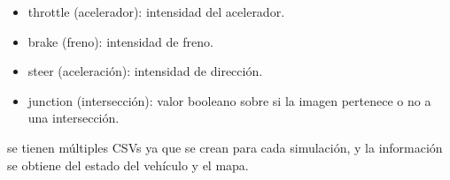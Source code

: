 \begin{itemize}[nosep]
	\item throttle (acelerador): intensidad del acelerador.
	\item brake (freno): intensidad de freno.
	\item steer (aceleración): intensidad de dirección.
	\item junction (intersección): valor booleano sobre si la imagen pertenece o no a una intersección.
\end{itemize}

se tienen múltiples CSVs ya que se crean para cada simulación, y la información se obtiene del estado del vehículo y el mapa.